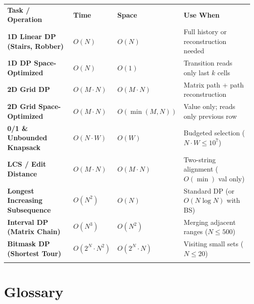 \documentclass[11pt,a4paper]{article}
\theoremstyle{definition}
\begin{document}
\begingroup\small{}
\begin{tabularx}{\textwidth}{>{\raggedright\arraybackslash\bfseries}p{4.3cm} >{\centering\arraybackslash}p{2.1cm} >{\centering\arraybackslash}p{2.2cm} >{\raggedright\arraybackslash}X}
\arrayrulecolor{primaryblue}\toprule[1.2pt]
\rowcolor{primaryblue!10}
\textcolor{primaryblue}{\textbf{Task / Operation}} & \textcolor{primaryblue}{\textbf{Time}} & \textcolor{primaryblue}{\textbf{Space}} & \textcolor{primaryblue}{\textbf{Use When}} \\
\arrayrulecolor{codeframe}\midrule[0.6pt]
1D Linear DP (Stairs, Robber) & $O(N)$ & $O(N)$ & Full history or reconstruction needed \\
1D DP Space-Optimized & $O(N)$ & $O(1)$ & Transition reads only last $k$ cells \\
2D Grid DP & $O(M \cdot N)$ & $O(M \cdot N)$ & Matrix path + path reconstruction \\
2D Grid Space-Optimized & $O(M \cdot N)$ & $O(\min(M, N))$ & Value only; reads only previous row \\
0/1 \& Unbounded Knapsack & $O(N \cdot W)$ & $O(W)$ & Budgeted selection ($N \cdot W \le 10^7$) \\
LCS / Edit Distance & $O(M \cdot N)$ & $O(M \cdot N)$ & Two-string alignment ($O(\min)$ val only) \\
Longest Increasing Subsequence & $O(N^2)$ & $O(N)$ & Standard DP (or $O(N \log N)$ with BS) \\
Interval DP (Matrix Chain) & $O(N^3)$ & $O(N^2)$ & Merging adjacent ranges ($N \le 500$) \\
Bitmask DP (Shortest Tour) & $O(2^N \cdot N^2)$ & $O(2^N \cdot N)$ & Visiting small sets ($N \le 20$) \\
\arrayrulecolor{primaryblue}\bottomrule[1.2pt]
\end{tabularx}\endgroup

\section{Glossary}
\end{document}
